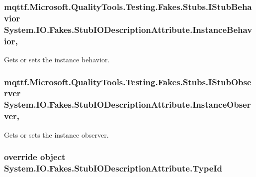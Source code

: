 \hypertarget{class_system_1_1_i_o_1_1_fakes_1_1_stub_i_o_description_attribute_a68479a7dc3f826823a6ad0ec90f5eac3}{
\subsubsection[{Instance\-Behavior}]{\setlength{\rightskip}{0pt plus 5cm}mqttf.\-Microsoft.\-Quality\-Tools.\-Testing.\-Fakes.\-Stubs.\-I\-Stub\-Behavior System.\-I\-O.\-Fakes.\-Stub\-I\-O\-Description\-Attribute.\-Instance\-Behavior\hspace{0.3cm}{\ttfamily [get]}, {\ttfamily [set]}}}\label{class_system_1_1_i_o_1_1_fakes_1_1_stub_i_o_description_attribute_a68479a7dc3f826823a6ad0ec90f5eac3}


Gets or sets the instance behavior.

\hypertarget{class_system_1_1_i_o_1_1_fakes_1_1_stub_i_o_description_attribute_a77afdd4659c80bdebbf86a68ddb52ccd}{
\subsubsection[{Instance\-Observer}]{\setlength{\rightskip}{0pt plus 5cm}mqttf.\-Microsoft.\-Quality\-Tools.\-Testing.\-Fakes.\-Stubs.\-I\-Stub\-Observer System.\-I\-O.\-Fakes.\-Stub\-I\-O\-Description\-Attribute.\-Instance\-Observer\hspace{0.3cm}{\ttfamily [get]}, {\ttfamily [set]}}}\label{class_system_1_1_i_o_1_1_fakes_1_1_stub_i_o_description_attribute_a77afdd4659c80bdebbf86a68ddb52ccd}


Gets or sets the instance observer.

\hypertarget{class_system_1_1_i_o_1_1_fakes_1_1_stub_i_o_description_attribute_a3e38f9273a0f069b082cad11eb12b3ac}{
\subsubsection[{Type\-Id}]{\setlength{\rightskip}{0pt plus 5cm}override object System.\-I\-O.\-Fakes.\-Stub\-I\-O\-Description\-Attribute.\-Type\-Id\hspace{0.3cm}{\ttfamily [get]}}}\label{class_system_1_1_i_o_1_1_fakes_1_1_stub_i_o_description_attribute_a3e38f9273a0f069b082cad11eb12b3ac}


